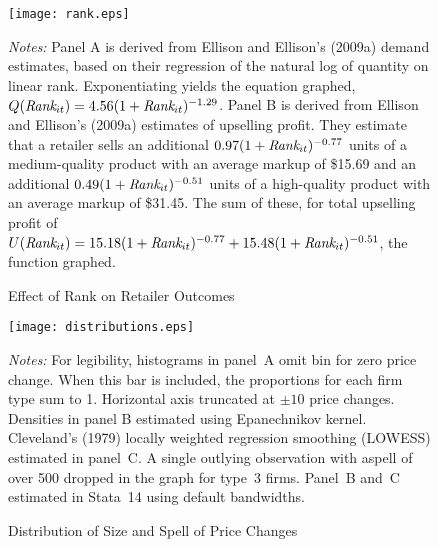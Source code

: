 \documentclass[11pt]{article}
\newcommand{\Rank}{\mbox{\it Rank}}
\begin{document}
\begin{figure}[p]
\centering
\caption{\label{f:rank}Effect of Rank on Retailer Outcomes} 
\vspace{3ex}
\texttt{[image: rank.eps]}\\[3ex]
\parbox{\textwidth}{\footnotesize {\em Notes:} Panel A is derived from
  Ellison and Ellison's (2009a) demand estimates, based on their
  regression of the natural log of quantity on linear
  rank. Exponentiating yields the equation graphed, $Q(\Rank_{it}) =
  4.56(1+\Rank_{it})^{-1.29}$. Panel B is derived from Ellison and
  Ellison's (2009a) estimates of upselling profit. They estimate that
  a retailer sells an additional $0.97(1+\Rank_{it})^{-0.77}$ units of
  a medium-quality product with an average markup of \$15.69 and an
  additional $0.49(1+\Rank_{it})^{-0.51}$ units of a high-quality
  product with an average markup of \$31.45. The sum of these, for
  total upselling profit of $U(\Rank_{it}) =
  15.18(1+\Rank_{it})^{-0.77} + 15.48(1+\Rank_{it})^{-0.51}$, the
  function graphed.}
\end{figure}

\clearpage

\begin{figure}[p]
\centering
\caption{\label{f:distributions}Distribution of Size and Spell of Price Changes} 
\vspace{3ex}
\texttt{[image: distributions.eps]}\\[3ex]
\parbox{\textwidth}{\footnotesize {\em Notes:} For legibility,
  histograms in panel~A omit bin for zero price change. When this bar
  is included, the proportions for each firm type sum to 1. Horizontal
  axis truncated at $\pm 10$ price changes. Densities in panel B
  estimated using Epanechnikov kernel. Cleveland's (1979) locally
  weighted regression smoothing (LOWESS) estimated in panel~C. A
  single outlying observation with aspell of over 500 dropped in the
  graph for type~3 firms. Panel~B and~C estimated in Stata~14 using
  default bandwidths.}
\end{figure}

\clearpage
\end{document}
